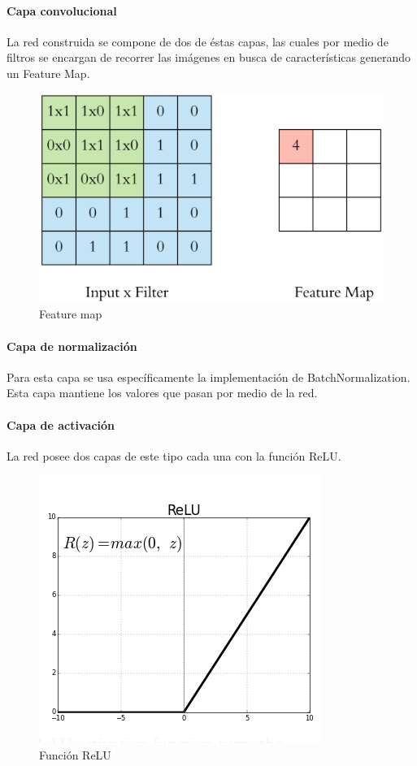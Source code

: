 \documentclass{article}
\begin{document}
\paragraph{Capa convolucional} La red construida se compone de dos de \'estas capas, las cuales por medio de filtros se encargan de recorrer las im\'agenes en busca de caracter\'isticas generando un Feature Map.
\begin{figure}[H]
  \caption{Feature map}
  \centering
  \includegraphics[scale=.20]{feature_map}
\end{figure}
\paragraph{Capa de normalizaci\'on} Para esta capa se usa espec\'ificamente la implementaci\'on de BatchNormalization. Esta capa mantiene los valores que pasan por medio de la red.
\paragraph{Capa de activaci\'on} La red posee dos capas de este tipo cada una con la funci\'on ReLU.
\begin{figure}[H]
  \caption{Funci\'on ReLU}
  \centering
  \includegraphics[scale=.40]{relu}
\end{figure}
\end{document}
